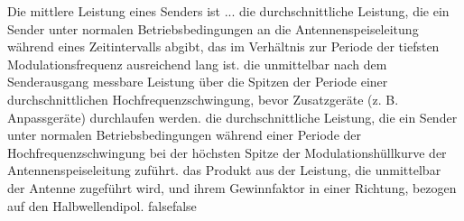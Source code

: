     {Die mittlere Leistung eines Senders ist ...}
    {die durchschnittliche Leistung, die ein Sender unter normalen Betriebsbedingungen an die Antennenspeiseleitung während eines Zeitintervalls abgibt, das im Verhältnis zur Periode der tiefsten Modulationsfrequenz ausreichend lang ist.}
    {die unmittelbar nach dem Senderausgang messbare Leistung über die Spitzen der Periode einer durchschnittlichen Hochfrequenzschwingung, bevor Zusatzgeräte (z. B. Anpassgeräte) durchlaufen werden.}
    {die durchschnittliche Leistung, die ein Sender unter normalen Betriebsbedingungen während einer Periode der Hochfrequenzschwingung bei der höchsten Spitze der Modulationshüllkurve der Antennenspeiseleitung zuführt.}
    {das Produkt aus der Leistung, die unmittelbar der Antenne zugeführt wird, und ihrem Gewinnfaktor in einer Richtung, bezogen auf den Halbwellendipol.}
    {false}{false}